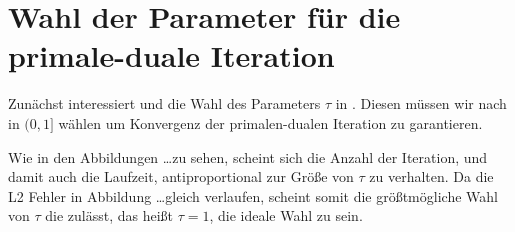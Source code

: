 \section{Wahl der Parameter für die primale-duale Iteration}
\label{sec:choiceOfParameters}

Zunächst interessiert und die Wahl des Parameters $\tau$ in 
. 
Diesen müssen wir nach  in $(0,1]$ wählen um
Konvergenz der primalen-dualen Iteration zu garantieren.

%


Wie in den Abbildungen \ldots zu sehen, scheint sich die Anzahl der Iteration,
und damit auch die Laufzeit, antiproportional zur Größe von $\tau$ zu
verhalten.
Da die L2 Fehler in Abbildung \ldots gleich verlaufen, scheint somit die
größtmögliche Wahl von $\tau$ die  zulässt, das
heißt $\tau=1$, die ideale Wahl zu sein.

